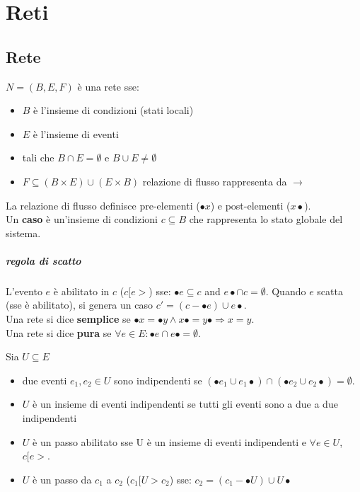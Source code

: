 \chapter{Reti}

\section{Rete}

$N = (B, E, F)$ \`e una rete sse:
\begin{itemize}
  \item $B$ \`e l'insieme di condizioni (stati locali)
  \item $E$ \`e l'insieme di eventi
  \item tali che $B \cap E = \emptyset$ e $B \cup E \neq \emptyset$
  \item $F \subseteq (B \times E) \cup (E \times B)$ relazione di flusso rappresenta da $\rightarrow$
\end{itemize}

La relazione di flusso definisce pre-elementi ($\bullet x$) e post-elementi ($x \bullet$). \\

Un \textbf{caso} \`e un'insieme di condizioni $c \subseteq B$ che rappresenta lo stato globale del sistema.

\paragraph{regola di scatto}

L'evento $e$ \`e abilitato in $c$ ($c[e>$) sse: $\bullet e \subseteq c$ and $e \bullet \cap c = \emptyset$.
Quando $e$ scatta (sse \`e abilitato), si genera un caso $c' = (c - \bullet e) \cup e \bullet$. \\

Una rete si dice \textbf{semplice} se $\bullet x = \bullet y \land x \bullet = y \bullet \Rightarrow x = y$.\\

Una rete si dice \textbf{pura} se $\forall e \in E : \bullet e \cap e \bullet = \emptyset$.

Sia $U \subseteq E$
\begin{itemize}
  \item due eventi $e_1,e_2 \in U$ sono indipendenti se $(\bullet e_1 \cup e_1 \bullet) \cap (\bullet e_2 \cup e_2 \bullet) = \emptyset$.
  \item $U$ \`e un insieme di eventi indipendenti se tutti gli eventi sono a due a due indipendenti
  \item $U$ \`e un passo abilitato sse U \`e un insieme di eventi indipendenti e $\forall e \in U$, $c[e>$.
  \item $U$ \`e un passo da $c_1$ a $c_2$ ($c_1[U>c_2$) sse: $c_2 = (c_1 - \bullet U) \cup U \bullet$
\end{itemize}

